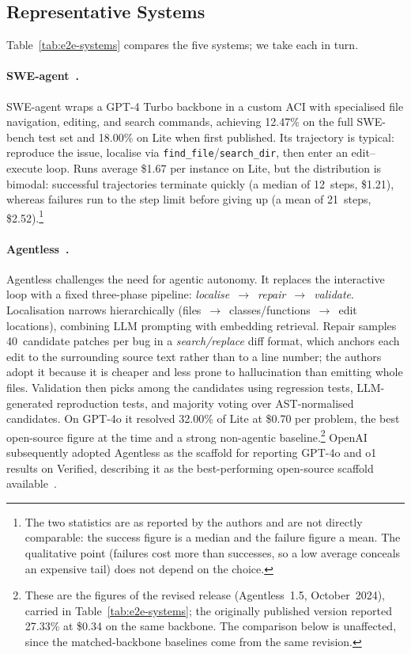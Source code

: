 \documentclass[
  english,        %
  font=times,     %
  twocolumn,      %
]{tumarticle}
\begin{document}
\subsection{Representative Systems}
\label{sec:e2e-systems}

Table~\ref{tab:e2e-systems} compares the five systems; we take each in turn.

\paragraph{SWE-agent~\cite{yang2024sweagent}.}
SWE-agent wraps a GPT-4 Turbo backbone in a custom ACI with specialised file
navigation, editing, and search commands, achieving 12.47\% on the full SWE-bench
test set and 18.00\% on Lite when first published. Its trajectory is typical:
reproduce the issue, localise via \texttt{find\_file}/\texttt{search\_dir}, then
enter an edit--execute loop.
Runs average \$1.67 per instance on Lite, but the distribution is bimodal:
successful trajectories terminate quickly (a median of 12~steps, \$1.21), whereas
failures run to the step limit before giving up (a mean of 21~steps,
\$2.52).\footnote{The two statistics are as reported by the authors and are not
directly comparable: the success figure is a median and the failure figure a
mean. The qualitative point (failures cost more than successes, so a low average
conceals an expensive tail) does not depend on the choice.}

\paragraph{Agentless~\cite{xia2024agentless}.}
Agentless challenges the need for agentic autonomy. It replaces the interactive
loop with a fixed three-phase pipeline:
\emph{localise}~$\to$~\emph{repair}~$\to$~\emph{validate}. Localisation narrows
hierarchically (files~$\to$~classes/functions~$\to$~edit locations), combining LLM
prompting with embedding retrieval. Repair samples 40~candidate patches per bug in
a \emph{search/replace} diff format, which anchors each edit to the surrounding
source text rather than to a line number; the authors adopt it because it is
cheaper and less prone to hallucination than emitting whole files. Validation then
picks among the candidates using regression tests, LLM-generated reproduction
tests, and majority voting over AST-normalised candidates. On GPT-4o it resolved
32.00\% of Lite at \$0.70 per problem, the best open-source figure at the time and
a strong non-agentic baseline.\footnote{These are the figures of the revised
release (Agentless~1.5, October~2024), carried in Table~\ref{tab:e2e-systems}; the
originally published version reported 27.33\% at \$0.34 on the same backbone. The
comparison below is unaffected, since the matched-backbone baselines come from the
same revision.} OpenAI subsequently adopted Agentless as the scaffold for
reporting GPT-4o and o1 results on Verified, describing it as the best-performing
open-source scaffold available~\cite{openai2024verified}.
\end{document}
